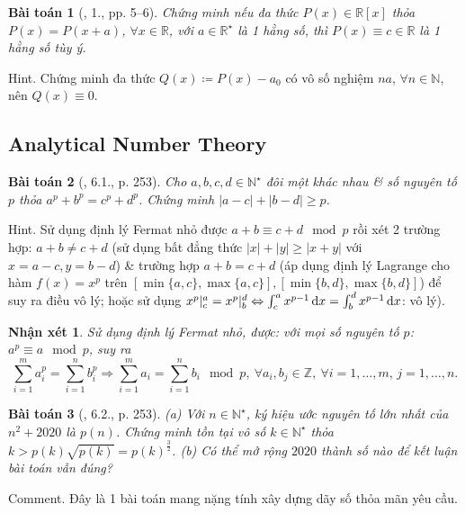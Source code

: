 \documentclass{article}
\newtheorem{baitoan}{Bài toán}
\newtheorem{nhanxet}{Nhận xét}
\begin{document}
\begin{baitoan}[\cite{Chung_pth_da_thuc}, 1., pp. 5--6]
	Chứng minh nếu đa thức $P(x)\in\mathbb{R}[x]$ thỏa $P(x) = P(x + a)$, $\forall x\in\mathbb{R}$, với $a\in\mathbb{R}^\star$ là 1 hằng số, thì $P(x)\equiv c\in\mathbb{R}$ là 1 hằng số tùy ý.
\end{baitoan}
{\sf Hint.} Chứng minh đa thức $Q(x)\coloneqq P(x) - a_0$ có vô số nghiệm $na$, $\forall n\in\mathbb{N}$, nên $Q(x)\equiv0$.


\subsection{Analytical Number Theory}

\begin{baitoan}[\cite{Quoc_Long_Dat_Nam_VMC}, 6.1., p. 253]
	Cho $a,b,c,d\in\mathbb{N}^\star$ đôi một khác nhau \& số nguyên tố $p$ thỏa $a^p + b^p = c^p + d^p$. Chứng minh $|a - c| + |b - d|\ge p$.
\end{baitoan}
{\sf Hint.} Sử dụng định lý Fermat nhỏ được $a + b\equiv c + d\mod p$ rồi xét 2 trường hợp: $a + b\ne c + d$ (sử dụng bất đẳng thức $|x| + |y|\ge|x + y|$ với $x = a - c,y = b - d$) \& trường hợp $a + b = c + d$ (áp dụng định lý Lagrange cho hàm $f(x) = x^p$ trên $[\min\{a,c\},\max\{a,c\}],[\min\{b,d\},\max\{b,d\}]$) để suy ra điều vô lý; hoặc sử dụng $x^p|_c^a = x^p|_b^d\Leftrightarrow\int_c^a x^{p-1}\,{\rm d}x = \int_b^d x^{p-1}\,{\rm d}x$: vô lý).

\begin{nhanxet}
	Sử dụng định lý Fermat nhỏ, được: với mọi số nguyên tố $p$: $a^p\equiv a\mod p$, suy ra
	\begin{equation*}
		\sum_{i=1}^m a_i^p = \sum_{i=1}^n b_i^p\Rightarrow\sum_{i=1}^m a_i = \sum_{i=1}^n b_i\mod p,\ \forall a_i,b_j\in\mathbb{Z},\ \forall i = 1,\ldots,m,\,j = 1,\ldots,n.
	\end{equation*}
\end{nhanxet}

\begin{baitoan}[\cite{Quoc_Long_Dat_Nam_VMC}, 6.2., p. 253]
	(a) Với $n\in\mathbb{N}^\star$, ký hiệu ước nguyên tố lớn nhất của $n^2 + 2020$ là $p(n)$. Chứng minh tồn tại vô số $k\in\mathbb{N}^\star$ thỏa $k > p(k)\sqrt{p(k)} = p(k)^{\frac{3}{2}}$. (b) Có thể mở rộng $2020$ thành số nào để kết luận bài toán vẫn đúng?
\end{baitoan}
{\sf Comment.} Đây là 1 bài toán mang nặng tính xây dựng dãy số thỏa mãn yêu cầu.
\end{document}
